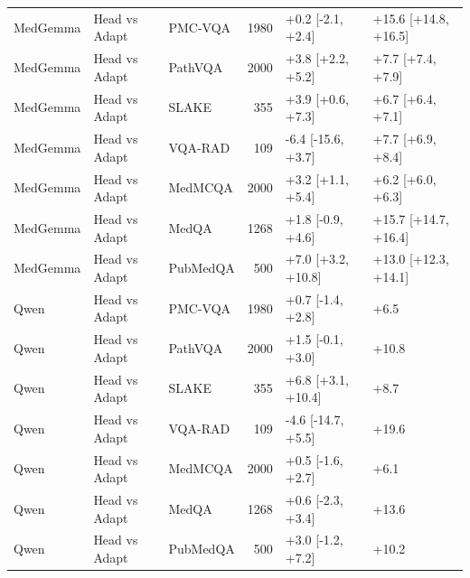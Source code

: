 \begin{longtable}{lllrll}
MedGemma & Head vs Adapt & PMC-VQA & 1980 & +0.2 [-2.1, +2.4] & +15.6 [+14.8, +16.5] \\
MedGemma & Head vs Adapt & PathVQA & 2000 & +3.8 [+2.2, +5.2] & +7.7 [+7.4, +7.9] \\
MedGemma & Head vs Adapt & SLAKE & 355 & +3.9 [+0.6, +7.3] & +6.7 [+6.4, +7.1] \\
MedGemma & Head vs Adapt & VQA-RAD & 109 & -6.4 [-15.6, +3.7] & +7.7 [+6.9, +8.4] \\
MedGemma & Head vs Adapt & MedMCQA & 2000 & +3.2 [+1.1, +5.4] & +6.2 [+6.0, +6.3] \\
MedGemma & Head vs Adapt & MedQA & 1268 & +1.8 [-0.9, +4.6] & +15.7 [+14.7, +16.4] \\
MedGemma & Head vs Adapt & PubMedQA & 500 & +7.0 [+3.2, +10.8] & +13.0 [+12.3, +14.1] \\
Qwen & Head vs Adapt & PMC-VQA & 1980 & +0.7 [-1.4, +2.8] & +6.5 \\
Qwen & Head vs Adapt & PathVQA & 2000 & +1.5 [-0.1, +3.0] & +10.8 \\
Qwen & Head vs Adapt & SLAKE & 355 & +6.8 [+3.1, +10.4] & +8.7 \\
Qwen & Head vs Adapt & VQA-RAD & 109 & -4.6 [-14.7, +5.5] & +19.6 \\
Qwen & Head vs Adapt & MedMCQA & 2000 & +0.5 [-1.6, +2.7] & +6.1 \\
Qwen & Head vs Adapt & MedQA & 1268 & +0.6 [-2.3, +3.4] & +13.6 \\
Qwen & Head vs Adapt & PubMedQA & 500 & +3.0 [-1.2, +7.2] & +10.2 \\
\end{longtable}
